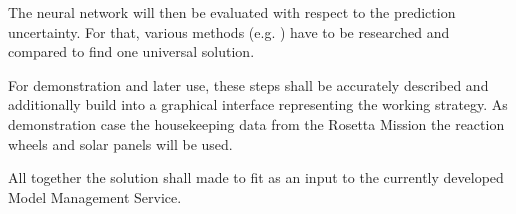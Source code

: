 \documentclass[10pt,a4paper]{scrartcl}
\begin{document}
The neural network will then be evaluated with respect to the prediction uncertainty. For that, various methods (e.g. \cite{yarin-dropout} \cite{model-confidence} \cite{weight-confidence}) have to be researched and compared to find one universal solution.

\bigbreak

For demonstration and later use, these steps shall be accurately described and additionally build into a graphical interface representing the working strategy. 
As demonstration case the housekeeping data from the Rosetta Mission the reaction wheels \cite{rosetta-maintenance} and solar panels will be used.

\bigbreak

All together the solution shall made to fit as an input to the currently developed Model Management Service.

\small
\end{document}
